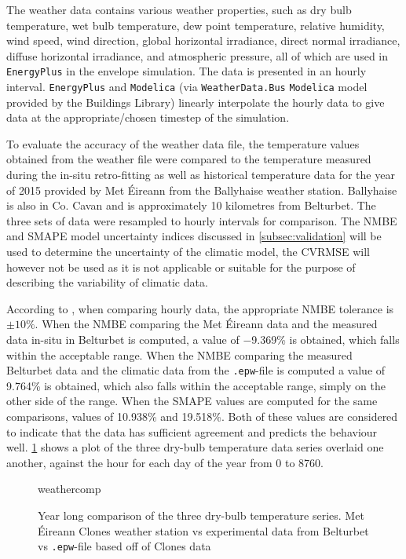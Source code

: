 The weather data contains various weather properties, such as dry bulb temperature, wet bulb temperature, dew point temperature, relative humidity, wind speed, wind direction, global horizontal irradiance, direct normal irradiance, diffuse horizontal irradiance, and atmospheric pressure, all of which are used in \texttt{EnergyPlus} in the envelope simulation. The data is presented in an hourly interval. \texttt{EnergyPlus} and \texttt{Modelica} (via \texttt{WeatherData.Bus} \texttt{Modelica} model provided by the Buildings Library) linearly interpolate the hourly data to give data at the appropriate/chosen timestep of the simulation. 

To evaluate the accuracy of the weather data file, the temperature values obtained from the weather file were compared to the temperature measured during the in-situ retro-fitting as well as historical temperature data for the year of 2015 provided by Met Éireann from the Ballyhaise weather station. Ballyhaise is also in Co. Cavan and is approximately 10 kilometres from Belturbet. The three sets of data were resampled to hourly intervals for comparison. The \ac{NMBE} and \ac{SMAPE} model uncertainty indices discussed in \cref{subsec:validation} will be used to determine the uncertainty of the climatic model, the \ac{CVRMSE} will however not be used as it is not applicable or suitable for the purpose of describing the variability of climatic data. 

According to  \cite{ashrae_guideline_project_committee_14_ashrae_2014}, when comparing hourly data, the appropriate \ac{NMBE} tolerance is $\pm10\%$. When the \ac{NMBE} comparing the Met Éireann data and the measured data  in-situ in Belturbet is computed, a value of \num{-9.369}\% is obtained, which falls within the acceptable range. When the \ac{NMBE} comparing the measured Belturbet data and the climatic data from the \texttt{.epw}-file is computed a value of \num{9.764}\% is obtained, which also falls within the acceptable range, simply on the other side of the range. When the \ac{SMAPE} values are computed for the same comparisons, values of \num{10.938}\% and \num{19.518}\%. Both of these values are considered to indicate that the data has sufficient agreement and predicts the behaviour well. \cref{fig:weathercomp} shows a plot of the three dry-bulb temperature data series overlaid one another, against the hour for each day of the year from 0 to 8760. 

\begin{figure}[htb]
    \centering
    {weathercomp}
    \caption{Year long comparison of the three dry-bulb temperature series. Met Éireann Clones weather station vs experimental data from Belturbet vs \texttt{.epw}-file based off of Clones data}
    \label{fig:weathercomp}
\end{figure}

